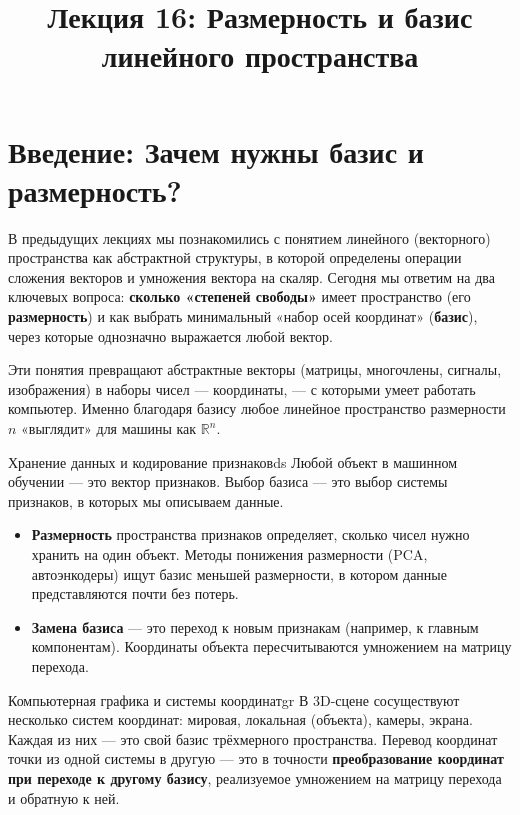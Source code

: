 \documentclass[12pt,a4paper]{article}
\title{Лекция 16: Размерность и базис линейного пространства}
\author{}
\date{}
\begin{document}
\maketitle
\thispagestyle{fancy}

\section*{Введение: Зачем нужны базис и размерность?}

В предыдущих лекциях мы познакомились с понятием линейного
(векторного) пространства как абстрактной структуры, в которой
определены операции сложения векторов и умножения вектора на скаляр.
Сегодня мы ответим на два ключевых вопроса: \textbf{сколько
«степеней свободы»} имеет пространство (его \textbf{размерность}) и как
выбрать минимальный «набор осей координат» (\textbf{базис}), через
которые однозначно выражается любой вектор.

Эти понятия превращают абстрактные векторы (матрицы, многочлены,
сигналы, изображения) в наборы чисел --- координаты, --- с которыми
умеет работать компьютер. Именно благодаря базису любое линейное
пространство размерности $n$ «выглядит» для машины как $\mathbb{R}^n$.

\begin{remarkIT}{Хранение данных и кодирование признаков}{ds}
  Любой объект в машинном обучении --- это вектор признаков. Выбор
  базиса --- это выбор системы признаков, в которых мы описываем
  данные.
  \begin{itemize}
    \item \textbf{Размерность} пространства признаков определяет, сколько
      чисел нужно хранить на один объект. Методы понижения размерности
      (PCA, автоэнкодеры) ищут базис меньшей размерности, в котором
      данные представляются почти без потерь.
    \item \textbf{Замена базиса} --- это переход к новым признакам
      (например, к главным компонентам). Координаты объекта пересчитываются
      умножением на матрицу перехода.
  \end{itemize}
\end{remarkIT}

\begin{remarkIT}{Компьютерная графика и системы координат}{gr}
  В 3D-сцене сосуществуют несколько систем координат: мировая,
  локальная (объекта), камеры, экрана. Каждая из них --- это свой
  базис трёхмерного пространства. Перевод координат точки из одной
  системы в другую --- это в точности \textbf{преобразование координат
  при переходе к другому базису}, реализуемое умножением на матрицу
  перехода и обратную к ней.
\end{remarkIT}
\end{document}
